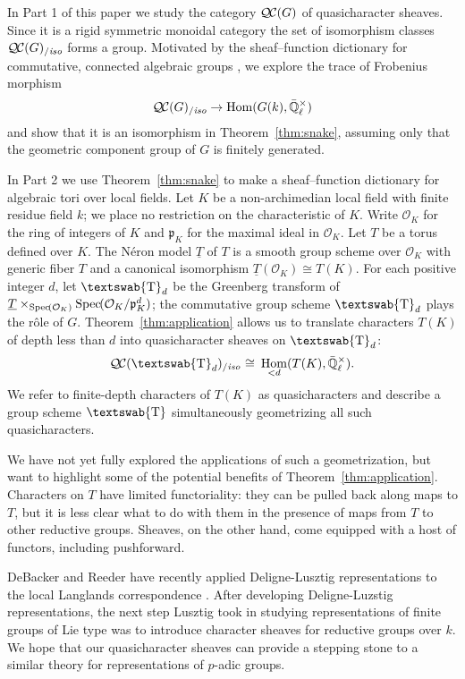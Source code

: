 \documentclass[11pt]{amsart}
\newcommand{\mathswab}[1]{\operatorname{\textswab{#1}}}
\theoremstyle{plain}
\theoremstyle{definition}
\theoremstyle{remark}
\newcommand{\Spec}[1]{{\operatorname{Spec}\hskip-1pt( #1 )}}
\newcommand{\EE}{\mathbb{\bar Q}_\ell}
\newcommand{\OK}{\mathcal{O}_K}
\newcommand{\pK}{\mathfrak{p}_K}
\newcommand{\Fq}{k}
\newcommand{\EEx}{\EE^\times}
\DeclareMathOperator{\Hom}{Hom}
\newcommand{\iso}{{\ \cong\ }}
\newcommand{\GN}[1]{\mathswab{#1}}
\newcommand{\TT}{\underline{T}}
\newcommand{\QC}{{\mathcal{Q\hskip-0.8pt C}}}
\newcommand{\QCiso}[1]{\QC(#1)_{/\textit{iso}}}
\newcommand\David[1]{\marginpar{\smaller\smaller DR: #1}}
\begin{document}
In Part 1 of this paper we study the category $\QC(G)$ of quasicharacter sheaves.
Since it is a rigid symmetric monoidal category
the set of isomorphism classes $\QCiso{G}$ forms a group.
Motivated by the sheaf--function dictionary for commutative, connected
algebraic groups \cite{deligne:SGA4.5},\David{more specific citation} we explore the trace of Frobenius morphism
\[
\QCiso{G} \to \Hom(G(\Fq), \EEx)
\]
and show that it is an isomorphism in Theorem~\ref{thm:snake}, assuming only
that the geometric component group of $G$ is finitely generated.

In Part 2 we use Theorem~\ref{thm:snake} to make a sheaf--function dictionary
for algebraic tori over local fields.  Let $K$ be a non-archimedian local field
with finite residue field $\Fq$; we place no restriction on the characteristic of $K$.
Write $\OK$ for the ring of integers of $K$ and $\pK$ for the maximal ideal in $\OK$.
Let $T$ be a torus defined over $K$.  The N\'eron model $\TT$ of $T$
is a smooth group scheme over $\OK$ with generic fiber $T$ and a canonical isomorphism
$\TT(\OK) \cong T(K)$.  For each positive integer $d$, let $\GN{T}_d$ be the
Greenberg transform of $\TT \times_{\Spec{\OK}} \Spec{\OK/\pK^d}$; the commutative
group scheme $\GN{T}_d$ plays the r\^{o}le of $G$.  Theorem~\ref{thm:application}
allows us to translate characters $T(K)$ of depth less than $d$ into quasicharacter sheaves on $\GN{T}_d$:
\[
\QCiso{\GN{T}_d} 
\iso
\Hom_{< d}(T(K),\EEx).
\]  
We refer to finite-depth characters of $T(K)$ as quasicharacters and
describe a group scheme $\GN{T}$ simultaneously geometrizing all such quasicharacters.

We have not yet fully explored the applications of such a geometrization, but want to highlight
some of the potential benefits of Theorem~\ref{thm:application}.  Characters on $T$ have limited
functoriality: they can be pulled back along maps to $T$, but it is less clear what to do with them
in the presence of maps from $T$ to other reductive groups.  Sheaves, on the other hand, come
equipped with a host of functors, including pushforward.  

DeBacker and Reeder have recently applied Deligne-Lusztig representations to the
local Langlands correspondence \cite{reeder-debacker:09a}.  
After developing Deligne-Luzstig representations, 
the next step Lusztig took in studying representations
of finite groups of Lie type was to introduce character sheaves for reductive groups over $\Fq$.
We hope that our quasicharacter sheaves can provide a stepping stone to a similar theory for
representations of $p$-adic groups.
\end{document}
